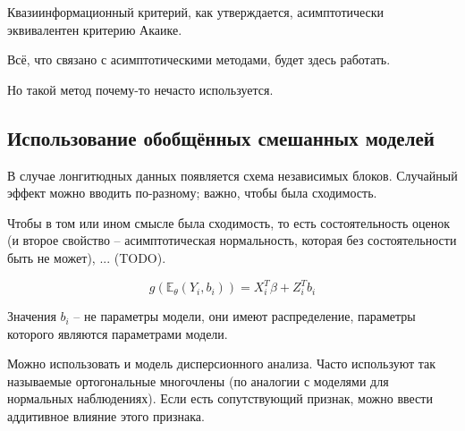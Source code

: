 \documentclass[main.tex]{subfiles}
\begin{document}

Квазиинформационный критерий, как утверждается, асимптотически эквивалентен критерию Акаике.

\begin{leftbar}
Всё, что связано с асимптотическими методами, будет здесь работать.
\end{leftbar}

Но такой метод почему-то нечасто используется.

\subsection{Использование обобщённых смешанных моделей}

В случае лонгитюдных данных появляется схема независимых блоков.
Случайный эффект можно вводить по-разному; важно, чтобы была сходимость.

Чтобы в том или ином смысле была сходимость, то есть состоятельность оценок (и второе свойство -- асимптотическая нормальность, которая без состоятельности быть не может), ... (TODO).

\[ g(\mathds E_\theta (Y_i,b_i)) = X_i^T \beta + Z_i^T b_i \]

Значения $ b_i $ -- не параметры модели, они имеют распределение, параметры которого являются параметрами модели.


Можно использовать и модель дисперсионного анализа.
Часто используют так называемые ортогональные многочлены (по аналогии с моделями для нормальных наблюдениях).
Если есть сопутствующий признак, можно ввести аддитивное влияние этого признака.
\end{document}
